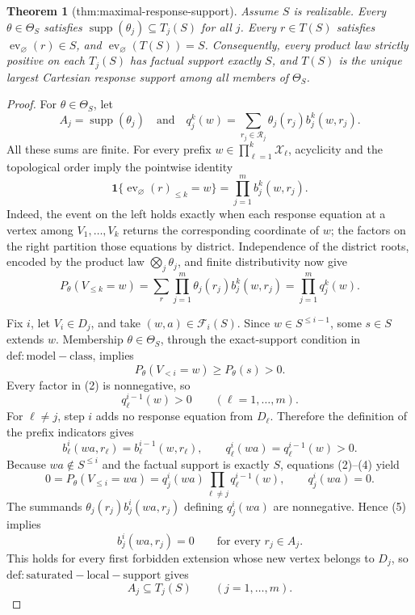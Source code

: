 \documentclass{article}
\newtheorem{theorem}{Theorem}
\begin{document}
\begin{theorem}[thm:maximal-response-support]\label{thm:maximal-response-support}
Assume \(S\) is realizable. Every \(\theta\in\Theta_S\) satisfies \(\operatorname{supp}(\theta_j)\subseteq T_j(S)\) for all \(j\). Every \(r\in T(S)\) satisfies \(\operatorname{ev}_{\varnothing}(r)\in S\), and \(\operatorname{ev}_{\varnothing}(T(S))=S\). Consequently, every product law strictly positive on each \(T_j(S)\) has factual support exactly \(S\), and \(T(S)\) is the unique largest Cartesian response support among all members of \(\Theta_S\).
\end{theorem}
\begin{proof}
For \(\theta\in\Theta_S\), let
\[
A_j=\operatorname{supp}(\theta_j)
\quad\text{and}\quad
q_j^k(w)=\sum_{r_j\in\mathcal R_j}\theta_j(r_j)b_j^k(w,r_j).
\]
All these sums are finite.  For every prefix \(w\in\prod_{\ell=1}^k\mathcal X_\ell\), acyclicity and the topological order imply the pointwise identity
\[
\mathbf 1\{\operatorname{ev}_{\varnothing}(r)_{\le k}=w\}
=\prod_{j=1}^m b_j^k(w,r_j).                                  \tag{1}
\]
Indeed, the event on the left holds exactly when each response equation at a vertex among \(V_1,\ldots,V_k\) returns the corresponding coordinate of \(w\); the factors on the right partition those equations by district.  Independence of the district roots, encoded by the product law \(\bigotimes_j\theta_j\), and finite distributivity now give
\[
P_\theta(V_{\le k}=w)
=\sum_r\prod_{j=1}^m\theta_j(r_j)b_j^k(w,r_j)
=\prod_{j=1}^m q_j^k(w).                                      \tag{2}
\]

Fix \(i\), let \(V_i\in D_j\), and take \((w,a)\in\mathcal F_i(S)\).  Since \(w\in S^{\le i-1}\), some \(s\in S\) extends \(w\).  Membership \(\theta\in\Theta_S\), through the exact-support condition in \(\mathrm{def:model-class}\), implies
\[
P_\theta(V_{<i}=w)\ge P_\theta(s)>0.
\]
Every factor in (2) is nonnegative, so
\[
q_\ell^{i-1}(w)>0\qquad(\ell=1,\ldots,m).                    \tag{3}
\]
For \(\ell\ne j\), step \(i\) adds no response equation from \(D_\ell\).  Therefore the definition of the prefix indicators gives
\[
b_\ell^i(wa,r_\ell)=b_\ell^{i-1}(w,r_\ell),
\qquad
q_\ell^i(wa)=q_\ell^{i-1}(w)>0.                              \tag{4}
\]
Because \(wa\notin S^{\le i}\) and the factual support is exactly \(S\), equations (2)--(4) yield
\[
0=P_\theta(V_{\le i}=wa)
=q_j^i(wa)\prod_{\ell\ne j}q_\ell^{i-1}(w),
\qquad q_j^i(wa)=0.                                           \tag{5}
\]
The summands \(\theta_j(r_j)b_j^i(wa,r_j)\) defining \(q_j^i(wa)\) are nonnegative.  Hence (5) implies
\[
b_j^i(wa,r_j)=0\qquad\text{for every }r_j\in A_j.
\]
This holds for every first forbidden extension whose new vertex belongs to \(D_j\), so \(\mathrm{def:saturated-local-support}\) gives
\[
A_j\subseteq T_j(S)\qquad(j=1,\ldots,m).                     \tag{6}
\]


\end{proof}
\end{document}
